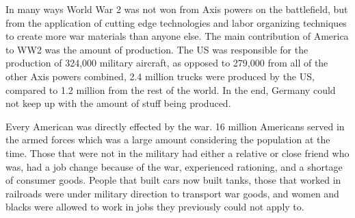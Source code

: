 In many ways World War 2 was not won from Axis powers on the battlefield, but from the application of cutting edge technologies and labor organizing techniques to create more war materials than anyone else.
The main contribution of America to WW2 was the amount of production.
The US was responsible for the production of 324,000 military aircraft, as opposed to 279,000 from all of the other Axis powers combined, 2.4 million trucks were produced by the US, compared to 1.2 million from the rest of the world.
In the end, Germany could not keep up with the amount of stuff being produced.

Every American was directly effected by the war.
16 million Americans served in the armed forces which was a large amount considering the population at the time.
Those that were not in the military had either a relative or close friend who was, had a job change because of the war, experienced rationing, and a shortage of consumer goods.
People that built cars now built tanks, those that worked in railroads were under military direction to transport war goods, and women and blacks were allowed to work in jobs they previously could not apply to.

